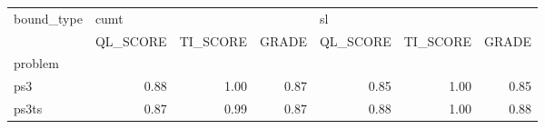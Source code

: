 \begin{tabular}{lrrrrrr}
\toprule
bound\_type & \multicolumn{3}{l}{cumt} & \multicolumn{3}{l}{sl} \\
{} & QL\_SCORE & TI\_SCORE & GRADE & QL\_SCORE & TI\_SCORE & GRADE \\
problem &          &          &       &          &          &       \\
\midrule
ps3     &     0.88 &     1.00 &  0.87 &     0.85 &     1.00 &  0.85 \\
ps3ts   &     0.87 &     0.99 &  0.87 &     0.88 &     1.00 &  0.88 \\
\bottomrule
\end{tabular}
